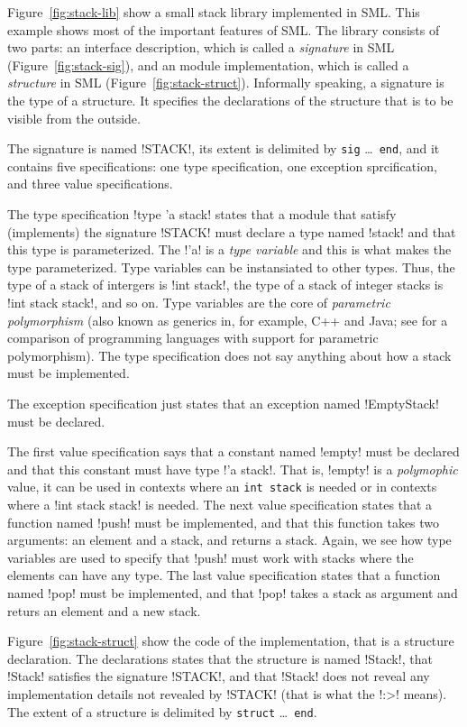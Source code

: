 \documentclass[workingdraft]{usetex-v1}
\begin{document}
Figure~\ref{fig:stack-lib} show a small stack library implemented in
SML.  This example shows most of the important features of SML.  The
library consists of two parts: an interface description, which is
called a \emph{signature} in SML (Figure~\ref{fig:stack-sig}), and an
module implementation, which is called a \emph{structure} in SML
(Figure~\ref{fig:stack-struct}).  Informally speaking, a
signature is the type of a structure. It specifies the
declarations of the structure that is to be visible from the outside.


The signature is named !STACK!, its extent is delimited by
\texttt{sig} \ldots\ \texttt{end}, and it contains five
specifications: one type specification, one exception sprcification,
and three value specifications.

The type specification !type 'a stack! states that a module that
satisfy (implements) the signature !STACK! must declare a type named
!stack! and that this type is parameterized.  The !'a! is a \emph{type
  variable} and this is what makes the type parameterized.  Type
variables can be instansiated to other types.  Thus, the type of a
stack of intergers is !int stack!, the type of a stack of integer
stacks is !int stack stack!, and so on. Type variables are the core of
\emph{parametric polymorphism} (also known as generics in, for
example, C++ and Java; see \cite{garcia03:generics} for a comparison
of programming languages with support for parametric polymorphism).
The type specification does not say anything about how a stack must be
implemented.

The exception specification just states that an exception named
!EmptyStack! must be declared.

The first value specification says that a constant named !empty! must
be declared and that this constant must have type !'a stack!.  That
is, !empty! is a \emph{polymophic} value, it can be used in contexts
where an \texttt{int stack} is needed or in contexts where a
!int stack stack! is needed.  The next value specification states that a
function named !push! must be implemented, and that this function
takes two arguments: an element and a stack, and returns a stack.
Again, we see how type variables are used to specify that !push! must
work with stacks where the elements can have any type.  The last value
specification states that a function named !pop! must be implemented,
and that !pop!  takes a stack as argument and returs an element and a
new stack.

Figure~\ref{fig:stack-struct} show the code of the implementation, that is a
structure declaration.  The declarations states
that the structure is named !Stack!, that !Stack! satisfies the
signature !STACK!, and that !Stack! does not reveal any implementation
details not revealed by !STACK! (that is what the !:>! means).  The
extent of a structure is delimited by \texttt{struct} \ldots\ 
\texttt{end}.
\end{document}
